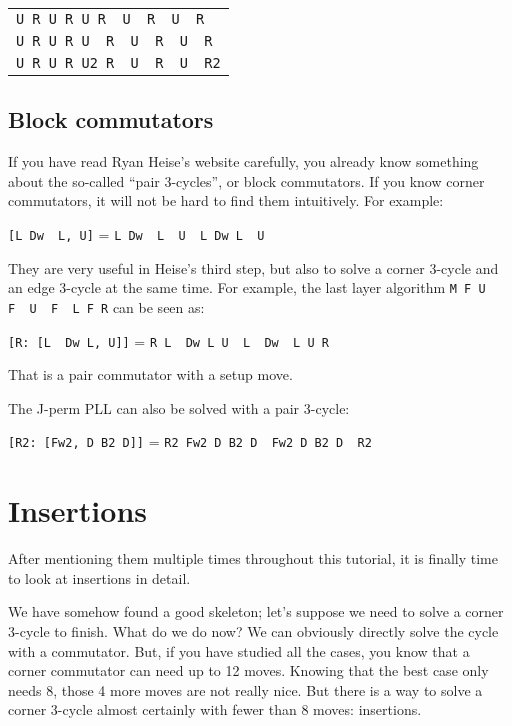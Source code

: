 \documentclass[11pt,a4paper]{book}
\newcommand{\p}{\textquotesingle}
\newcommand{\m}{\texttt}
\newcommand{\ps}{\p\,\,}
\begin{document}
\begin{center}
\begin{tabular}{l}
\m{U R U R U R\ps U\ps R\ps U\ps R\p}\\
\m{U R U R U\ps R\ps U\ps R\ps U\ps R}\\
\m{U R U R U2 R\ps U\ps R\ps U\ps R2}
\end{tabular}
\end{center}

\subsection{Block commutators}

If you have read Ryan Heise's website carefully, you already know something about the so-called ``pair 3-cycles'', or block commutators. If you know corner commutators, it will not be hard to find them intuitively. For example:

\begin{center}
\m{[L Dw\ps L\p, U\p]} = \m{L Dw\ps L\ps U\ps L Dw L\ps U}
\end{center}

They are very useful in Heise's third step, but also to solve a corner 3-cycle and an edge 3-cycle at the same time. For example, the last layer algorithm \m{M F U F\ps U\ps F\ps L F R\p} can be seen as:

\begin{center}
\m{[R: [L\ps Dw L, U\p]]} = \m{R L\ps Dw L U\ps L\ps Dw\ps L U R\p}
\end{center}

That is a pair commutator with a setup move.

The J-perm PLL can also be solved with a pair 3-cycle:

\begin{center}
\m{[R2: [Fw2, D B2 D\p]]} = \m{R2 Fw2 D B2 D\ps Fw2 D B2 D\ps R2}
\end{center}

\section{Insertions}

After mentioning them multiple times throughout this tutorial, it is finally time to look at insertions in detail.

We have somehow found a good skeleton; let's suppose we need to solve a corner 3-cycle to finish. What do we do now? We can obviously directly solve the cycle with a commutator. But, if you have studied all the cases, you know that a corner commutator can need up to 12 moves. Knowing that the best case only needs 8, those 4 more moves are not really nice. But there is a way to solve a corner 3-cycle almost certainly with fewer than 8 moves: insertions.
\end{document}
